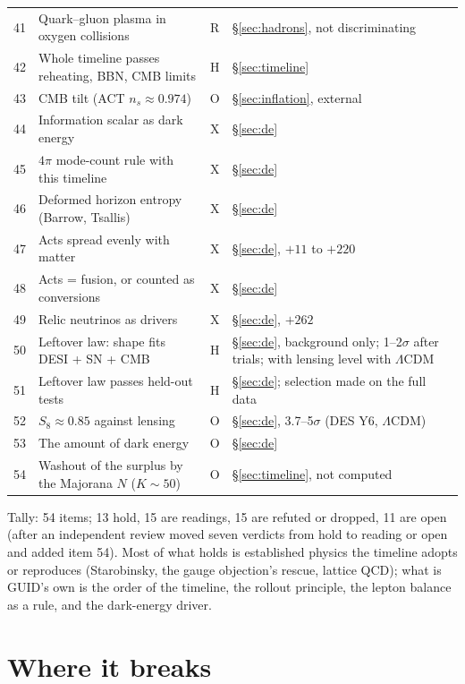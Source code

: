 \documentclass[11pt,a4paper]{article}
\begin{document}
{\begin{longtable}{@{}rp{8.4cm}cp{4.6cm}@{}}
41 & Quark--gluon plasma in oxygen collisions & R & \S\ref{sec:hadrons}, not discriminating \\
42 & Whole timeline passes reheating, BBN, CMB limits & H & \S\ref{sec:timeline} \\
43 & CMB tilt (ACT $n_s\approx0.974$) & O & \S\ref{sec:inflation}, external \\
44 & Information scalar as dark energy & X & \S\ref{sec:de} \\
45 & $4\pi$ mode-count rule with this timeline & X & \S\ref{sec:de} \\
46 & Deformed horizon entropy (Barrow, Tsallis) & X & \S\ref{sec:de} \\
47 & Acts spread evenly with matter & X & \S\ref{sec:de}, $+11$ to $+220$ \\
48 & Acts = fusion, or counted as conversions & X & \S\ref{sec:de} \\
49 & Relic neutrinos as drivers & X & \S\ref{sec:de}, $+262$ \\
50 & Leftover law: shape fits DESI + SN + CMB & H & \S\ref{sec:de}, background only; 1--2$\sigma$ after trials; with lensing level with $\Lambda$CDM \\
51 & Leftover law passes held-out tests & H & \S\ref{sec:de}; selection made on the full data \\
52 & $S_8\approx0.85$ against lensing & O & \S\ref{sec:de}, 3.7--5$\sigma$ (DES Y6, $\Lambda$CDM) \\
53 & The amount of dark energy & O & \S\ref{sec:de} \\
54 & Washout of the surplus by the Majorana $N$ ($K\sim50$) & O & \S\ref{sec:timeline}, not computed \\
\bottomrule
\end{longtable}}

\noindent Tally: 54 items; 13 hold, 15 are readings, 15 are refuted or dropped, 11 are open (after an independent review moved seven
verdicts from hold to reading or open and added item 54). Most of what holds is established physics the
timeline adopts or reproduces (Starobinsky, the gauge objection's rescue, lattice QCD); what is GUID's own is the order of the timeline,
the rollout principle, the lepton balance as a rule, and the dark-energy driver.

\section{Where it breaks}\label{sec:break}
\end{document}
